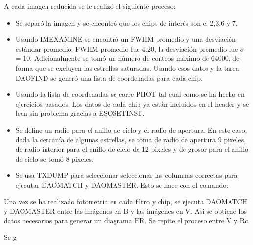 \documentclass[12pt]{article}
\begin{document}
A cada imagen reducida se le realizó el siguiente proceso:
\begin{itemize}
\item Se separó la imagen y se encontró que los chips de interés son el 2,3,6 y 7.
\item Usando IMEXAMINE se encontró un FWHM promedio y una desviación estándar promedio: FWHM promedio fue 4.20, la desviación promedio fue $\sigma$ = 10. Adicionalmente se tomó un número de conteos máximo de 64000, de forma que se excluyen las estrellas saturadas. Usando esos datos y la tarea DAOFIND se generó una lista de coordenadas para cada chip.
\item Usando la lista de coordenadas se corre PHOT tal cual como se ha hecho en ejercicios pasados. Los datos de cada chip ya están incluidos en el header y se leen sin problema gracias a ESOSETINST.
\item Se define un radio para el anillo de cielo y el radio de apertura. En este caso, dada la cercanía de algunas estrellas, se toma de radio de apertura 9 pixeles, de radio interior para el anillo de cielo de 12 pixeles y de grosor para el anillo de cielo se tomó 8 pixeles.
\item Se usa TXDUMP para seleccionar seleccionar las columnas correctas para ejecutar DAOMATCH y DAOMASTER. Esto se hace con el comando:

\end{itemize}
Una vez se ha realizado fotometría en cada filtro y chip, se ejecuta DAOMATCH y DAOMASTER entre las imágenes en B y las imágenes en V. Asi se obtiene los datos necesarios para generar un diagrama HR. Se repite el proceso entre V y Rc.
\item Se g


%

\end{document}
